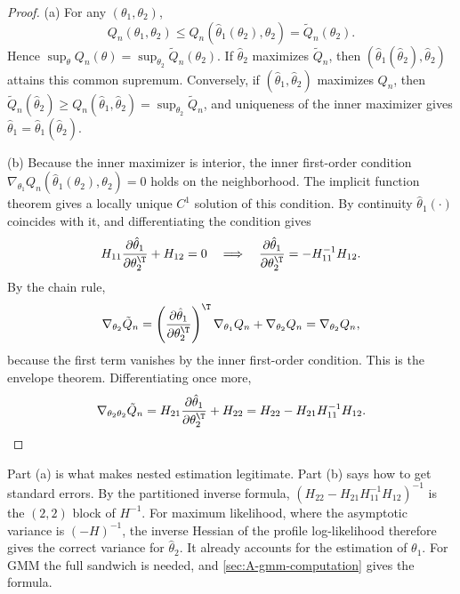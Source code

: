 \begin{proof}
(a) For any $(\theta_1, \theta_2)$,
\begin{equation*}
  Q_n(\theta_1, \theta_2) \le Q_n(\hat\theta_1(\theta_2), \theta_2) = \tilde Q_n(\theta_2).
\end{equation*}
Hence $\sup_{\theta}Q_n(\theta) = \sup_{\theta_2}\tilde Q_n(\theta_2)$. If $\hat\theta_2$ maximizes $\tilde Q_n$, then
$(\hat\theta_1(\hat\theta_2), \hat\theta_2)$ attains this common supremum. Conversely, if $(\hat\theta_1, \hat\theta_2)$
maximizes $Q_n$, then $\tilde Q_n(\hat\theta_2) \ge Q_n(\hat\theta_1, \hat\theta_2) = \sup_{\theta_2}\tilde Q_n$, and
uniqueness of the inner maximizer gives $\hat\theta_1 = \hat\theta_1(\hat\theta_2)$.

(b) Because the inner maximizer is interior, the inner first-order condition
$\nabla_{\theta_1}Q_n(\hat\theta_1(\theta_2), \theta_2) = 0$ holds on the neighborhood. The implicit function theorem gives
a locally unique $C^1$ solution of this condition. By continuity $\hat\theta_1(\cdot)$ coincides with it, and
differentiating the condition gives
\begin{equation*}
  H_{11}\frac{\partial\hat\theta_1}{\partial\theta_2^\T} + H_{12} = 0
  \quad\Longrightarrow\quad
  \frac{\partial\hat\theta_1}{\partial\theta_2^\T} = -H_{11}^{-1}H_{12}.
\end{equation*}
By the chain rule,
\begin{equation*}
  \nabla_{\theta_2}\tilde Q_n = \left(\frac{\partial\hat\theta_1}{\partial\theta_2^\T}\right)^\T\nabla_{\theta_1}Q_n
  + \nabla_{\theta_2}Q_n = \nabla_{\theta_2}Q_n,
\end{equation*}
because the first term vanishes by the inner first-order condition. This is the envelope theorem. Differentiating once
more,
\begin{equation*}
  \nabla_{\theta_2\theta_2}\tilde Q_n = H_{21}\frac{\partial\hat\theta_1}{\partial\theta_2^\T} + H_{22}
  = H_{22} - H_{21}H_{11}^{-1}H_{12}. \qedhere
\end{equation*}
\end{proof}

Part (a) is what makes nested estimation legitimate. Part (b) says how to get standard errors. By the partitioned
inverse formula, $(H_{22} - H_{21}H_{11}^{-1}H_{12})^{-1}$ is the $(2,2)$ block of $H^{-1}$. For maximum likelihood, where
the asymptotic variance is $(-H)^{-1}$, the inverse Hessian of the profile log-likelihood therefore gives the correct
variance for $\hat\theta_2$. It already accounts for the estimation of $\theta_1$. For GMM the full sandwich is needed,
and \cref{sec:A-gmm-computation} gives the formula.

